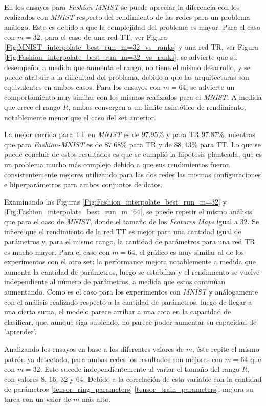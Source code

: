 \documentclass[spanish]{article}
\theoremstyle{definition}
\theoremstyle{remark}
\numberwithin{equation}{section}
\numberwithin{equation}{section} %
\begin{document}
En los ensayos para \textit{Fashion-MNIST} se puede apreciar la diferencia con los realizados con \textit{MNIST} respecto del rendimiento de las redes para un problema análogo. Esto es debido a que la complejidad del problema es mayor. Para el caso con $m=32$, para el caso de una red TT, ver Figura \ref{Fig:MNIST_interpolate_best_run_m=32_vs_ranks} y una red TR, ver Figura \ref{Fig:Fashion_interpolate_best_run_m=32_vs_ranks}, se advierte que su desempeño, a medida que aumenta el rango, no tiene el mismo desarrollo, y se puede atribuir a la dificultad del problema, debido a que las arquitecturas son equivalentes en ambos casos. Para los ensayos con $m=64$, se advierte un comportamiento muy similar con los mismos realizados para el \textit{MNIST}. A medida que crece el rango $R$, ambas convergen a un límite asintótico de rendimiento, notablemente menor que el caso del set anterior.
\par
La mejor corrida para TT en \textit{MNIST} es de $97.95\%$ y para TR $97.87\%$, mientras que para \textit{Fashion-MNIST} es de $87.68\%$ para TR y de $88,43\%$ para TT. Lo que se puede concluir de estos resultados es que se cumplió la hipótesis planteada, que es un problema mucho más complejo debido a que sus rendimientos fueron consistentemente mejores utilizando para las dos redes las mismas configuraciones e hiperparámetros para ambos conjuntos de datos.
\par
Examinando las Figuras \ref{Fig:Fashion_interpolate_best_run_m=32} y \ref{Fig:Fashion_interpolate_best_run_m=64}, se puede repetir el mismo análisis que para el caso de \textit{MNIST}, donde el tamaño de los \textit{Features Maps} igual a $32$. Se infiere que el rendimiento de la red TT es mejor para una cantidad igual de parámetros y, para el mismo rango, la cantidad de parámetros para una red TR es mucho mayor. Para el caso con $m=64$, el gráfico es muy similar al de los experimentos con el otro set: la performance mejora notablemente a medida que aumenta la cantidad de parámetros, luego se estabiliza y el rendimiento se vuelve independiente al número de parámetros, a medida que estos continúan aumentando. Como es el caso para los experimentos con \textit{MNIST} y análogamente con el análisis realizado respecto a la cantidad de parámetros, luego de llegar a una cierta suma, el modelo parece arribar a una cota en la capacidad de clasificar, que, aunque siga subiendo, no parece poder aumentar su capacidad de 'aprender'. 
\par
Analizando los ensayos en base a los diferentes valores de $m$, éste repite el mismo patrón ya detectado, para ambas redes los resultados son mejores con $m=64$ que con $m=32$. Esto sucede independientemente al variar el tamaño del rango $R$, con valores 8, 16, 32 y 64. Debido a la correlación de esta variable con la cantidad de parámetros \eqref{tensor_ring_parameters} \eqref{tensor_train_parameters}, mejora su tarea con un valor de $m$ más alto.     
\end{document}
